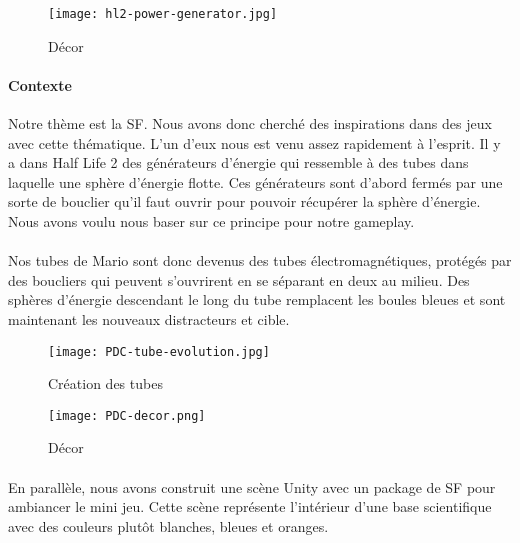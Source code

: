 \begin{wrapfigure}[13]{l}{6cm}
    \vspace{-10pt}
    \texttt{[image: hl2-power-generator.jpg]}
    \captionsetup{labelformat=simpleNumber}
    \caption{Décor}
\end{wrapfigure}

\paragraph{Contexte}Notre thème est la \gls{SF}. Nous avons donc cherché des inspirations dans des jeux avec cette thématique. L'un d'eux nous est venu assez rapidement à l'esprit.
Il y a dans Half Life 2 des générateurs d'énergie qui ressemble à des tubes dans laquelle une sphère d'énergie flotte. Ces générateurs sont d'abord fermés par une sorte de bouclier
qu'il faut ouvrir pour pouvoir récupérer la sphère d'énergie. Nous avons voulu nous baser sur ce principe pour notre gameplay.

\paragraph{}Nos tubes de Mario sont donc devenus des tubes électromagnétiques, protégés par des boucliers qui peuvent s'ouvrirent en se séparant en deux au milieu. Des sphères
d'énergie descendant le long du tube remplacent les boules bleues et sont maintenant les nouveaux distracteurs et cible.

\begin{figure}[H]
    \begin{center}
    \texttt{[image: PDC-tube-evolution.jpg]}
    \end{center}
    \caption{Création des tubes}
\label{TubeEvolution}
\end{figure}

\begin{wrapfigure}[5]{r}{5cm}
    \vspace{-25pt}
    \texttt{[image: PDC-decor.png]}
    \captionsetup{labelformat=simpleNumber}
    \caption{Décor}
\end{wrapfigure}

\paragraph{}En parallèle, nous avons construit une scène Unity avec un package de \gls{SF} pour ambiancer le mini jeu. Cette scène représente l'intérieur d'une base scientifique avec
des couleurs plutôt blanches, bleues et oranges.


